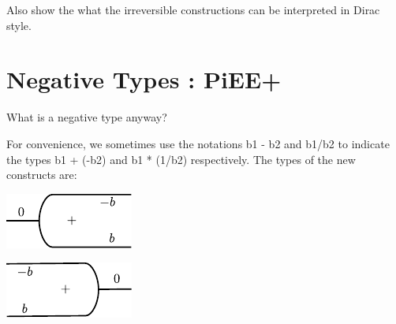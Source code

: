 \documentclass[preprint]{sigplanconf}
\begin{document}
Also show the what the irreversible constructions can be interpreted
in Dirac style.


\section{Negative Types : {{PiEE+}} }

What is a negative type anyway? 


%

For convenience, we sometimes use the notations {{b1 - b2}} and
{{b1/b2}} to indicate the types {{b1 + (-b2)}} and {{b1 * (1/b2)}}
respectively.  The types of the new constructs are:
\vspace{-15pt}
\begin{multicols}{2}  

\end{multicols}


\begin{multicols}{2}
\begin{center}
  \includegraphics{diagrams/eta.pdf}
\end{center}
  
\begin{center}
 \includegraphics{diagrams/eps.pdf}
\end{center}
\end{multicols}

\begin{multicols}{2}
\begin{center}
\end{center}
  
\begin{center}
\end{center}  
\end{multicols}
\end{document}
